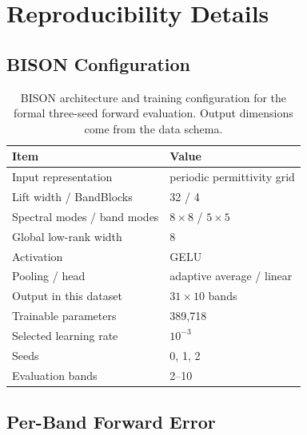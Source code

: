 
\section{Reproducibility Details}

\subsection{BISON Configuration}

\begin{table}[H]
  \caption{BISON architecture and training configuration for the formal
  three-seed forward evaluation. Output dimensions come from the data schema.}
  \label{tab:bison-config}
  \centering
  \small
  \begin{tabular}{ll}
    \toprule
    Item & Value \\
    \midrule
    Input representation & periodic permittivity grid \\
    Lift width / BandBlocks & 32 / 4 \\
    Spectral modes / band modes & $8\times8$ / $5\times5$ \\
    Global low-rank width & 8 \\
    Activation & GELU \\
    Pooling / head & adaptive average / linear \\
    Output in this dataset & $31\times10$ bands \\
    Trainable parameters & 389,718 \\
    Selected learning rate & $10^{-3}$ \\
    Seeds & 0, 1, 2 \\
    Evaluation bands & 2--10 \\
    \bottomrule
  \end{tabular}
\end{table}

\subsection{Per-Band Forward Error}

\begin{table}[H]
  \caption{BISON test MRE (\%) by band, averaged over seeds 0, 1, and 2.}
  \label{tab:per-band}
  \centering
  \small
\end{table}

